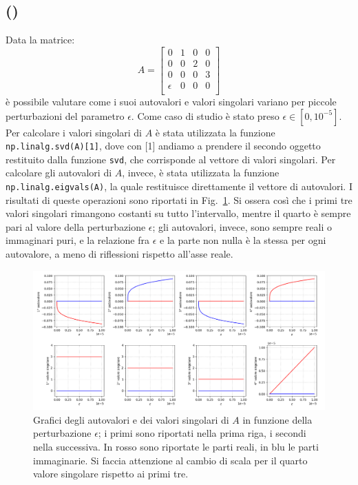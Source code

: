 \documentclass[a4paper]{article}
\newcounter{count_es}
\newcounter{count_sub_es}[count_es]
\renewcommand{\figurename}{Fig.}
\begin{document}
\subsection*{ ()}
Data la matrice:
\[A = \begin{bmatrix}
        0 & 1 & 0 & 0 \\
        0 & 0 & 2 & 0 \\
        0 & 0 & 0 & 3 \\
        \epsilon & 0 & 0 & 0 \\
    \end{bmatrix}\]
è possibile valutare come i suoi autovalori e valori singolari variano per piccole
perturbazioni del parametro \(\epsilon\). Come caso di studio è stato preso \(\epsilon \in [0, 10^{-5}]\).
Per calcolare i valori singolari di \(A\) è stata utilizzata la funzione
\lstinline{np.linalg.svd(A)[1]}, dove con [1] andiamo a prendere il secondo oggetto 
restituito dalla funzione \lstinline{svd}, che corrisponde al vettore di valori singolari.
Per calcolare gli autovalori di \(A\), invece, è stata utilizzata la funzione
\lstinline{np.linalg.eigvals(A)}, la quale restituisce direttamente il vettore di autovalori.
I risultati di queste operazioni sono riportati in \figurename~\ref{fig:es_2a}.
Si ossera così che i primi tre valori singolari rimangono costanti su tutto
l'intervallo, mentre il quarto è sempre pari al valore della perturbazione \(\epsilon\); 
gli autovalori, invece, sono sempre reali o immaginari puri, e la relazione fra \(\epsilon\) e 
la parte non nulla è la stessa per ogni autovalore, a meno di riflessioni rispetto all'asse reale.
\begin{figure}[H]
    \centering
    \includegraphics[width=.95\linewidth]{Es_2a.png}
    \caption{Grafici degli autovalori e dei valori singolari di \(A\) in funzione della 
    perturbazione \(\epsilon\); i primi sono riportati nella prima riga, i secondi nella successiva.
    In rosso sono riportate le parti reali, in blu le parti immaginarie. Si faccia attenzione 
    al cambio di scala per il quarto valore singolare rispetto ai primi tre.\label{fig:es_2a}}
\end{figure}    
\end{document}
